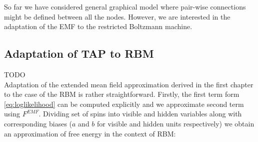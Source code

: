 \documentclass[../report/report.tex]{subfiles}
\begin{document}
So far we have considered general graphical model where pair-wise connections might be defined between all the nodes. However, we are interested in the adaptation of the EMF to the restricted Boltzmann machine.
\subsection{Adaptation of TAP to RBM}
TODO
\\
Adaptation of the extended mean field approximation derived in the first chapter to the case of the RBM is rather straightforward. Firstly, the first term form \ref{eq:loglikelihood} can be computed explicitly and we approximate second term using $F^{EMF}$. Dividing set of spins into visible and hidden variables along with corresponding biases ($a$ and $b$ for visible and hidden units respectively) we obtain an approximation of free energy in the context of RBM:
\end{document}
